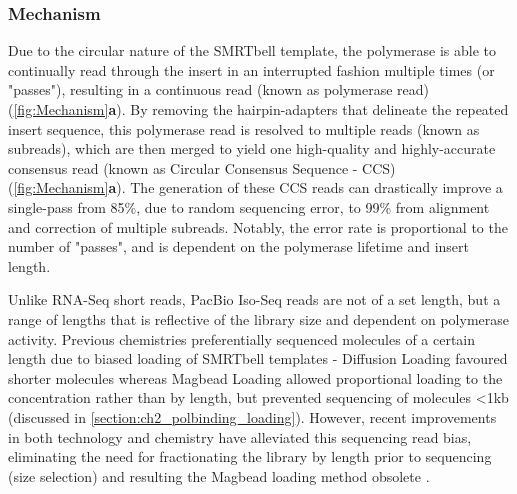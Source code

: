\vspace{1cm}
\subsubsection{Mechanism}
Due to the circular nature of the SMRTbell template, the polymerase is able to continually read through the insert in an interrupted fashion multiple times (or "passes"), resulting in a continuous read (known as polymerase read) (\cref{fig:Mechanism}\textbf{a}). By removing the hairpin-adapters that delineate the repeated insert sequence, this polymerase read is resolved to multiple reads (known as subreads), which are then merged to yield one high-quality and highly-accurate consensus read (known as Circular Consensus Sequence - CCS) (\cref{fig:Mechanism}\textbf{a}). The generation of these CCS reads can drastically improve a single-pass from 85\%, due to random sequencing error, to 99\% from alignment and correction of multiple subreads. Notably, the error rate is proportional to the number of "passes", and is dependent on the polymerase lifetime and insert length\cite{Travers2010}. 

Unlike RNA-Seq short reads, PacBio Iso-Seq reads are not of a set length, but a range of lengths that is reflective of the library size and dependent on polymerase activity\cite{Ardui2018,Rhoads2015}. Previous chemistries preferentially sequenced molecules of a certain length due to biased loading of SMRTbell templates - Diffusion Loading favoured shorter molecules\cite{Loomis2013} whereas Magbead Loading allowed proportional loading to the concentration rather than by length, but prevented sequencing of molecules <1kb (discussed in \cref{section:ch2_polbinding_loading}). However, recent improvements in both technology and chemistry have alleviated this sequencing read bias, eliminating the need for fractionating the library by length prior to sequencing (size selection) and resulting the Magbead loading method obsolete \cite{Oikonomopoulos2020}.

